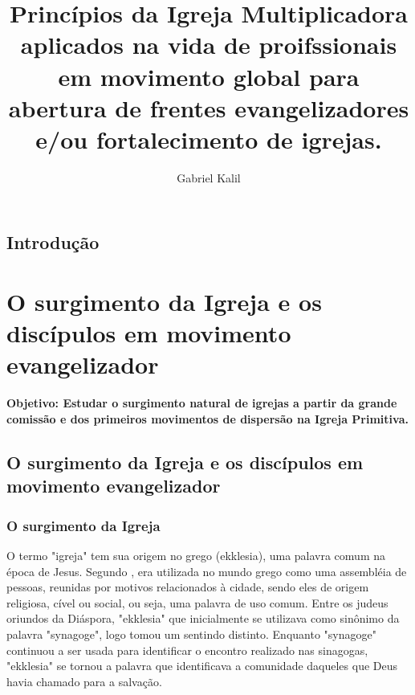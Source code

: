 \documentclass[
	12pt,				%
	openright,			%
	twoside,			%
	a4paper,			%
	english,			%
	french,				%
	spanish,			%
	brazil				%
	]{abntex2}
\title{Princípios da Igreja Multiplicadora aplicados na vida de proifssionais em movimento global para abertura de frentes evangelizadores e/ou fortalecimento de igrejas.}
\author{Gabriel Kalil}
\date{ }
\begin{document}
  
\maketitle
  
\tableofcontents

\section{Introdução}


\chapter{O surgimento da Igreja e os discípulos em movimento evangelizador}

\textbf{Objetivo: Estudar o surgimento natural de igrejas a partir da grande comissão e dos primeiros movimentos de dispersão na Igreja Primitiva.}


\section{O surgimento da Igreja e os discípulos em movimento evangelizador}
 
\subsection{O surgimento da Igreja}

O termo "igreja" tem sua origem no grego (ekklesia), uma palavra comum na época de Jesus. Segundo \cite[317]{zac}, era utilizada no mundo grego como uma assembléia de pessoas, reunidas por motivos relacionados à cidade, sendo eles de origem religiosa, cível ou social, ou seja, uma palavra de uso comum. Entre os judeus oriundos da Diáspora, "ekklesia" que inicialmente se utilizava como sinônimo da palavra "synagoge", logo tomou um sentindo distinto. Enquanto "synagoge" continuou a ser usada para identificar o encontro realizado nas sinagogas, "ekklesia" se tornou a palavra que identificava a comunidade daqueles que Deus havia chamado para a salvação\cite[485]{bavinck}. 
\end{document}
